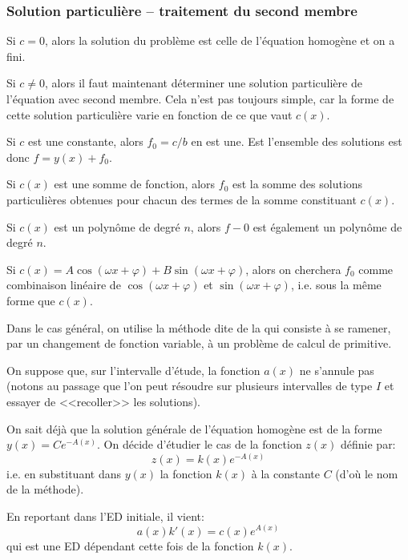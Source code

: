\medskip
\subsubsection{Solution particulière  -- traitement du second membre}

Si $c=0$, alors la solution du problème est celle de l'équation homogène et on a fini.

\medskip
Si $c\ne0$, alors il faut maintenant déterminer une solution particulière de l'équation avec
second membre. Cela n'est pas toujours simple, car la forme de cette solution particulière varie 
en fonction de ce que vaut $c(x)$.

\medskip
Si $c$ est une constante, alors  $f_0=c/b$ en est une. Est l'ensemble des solutions
est donc $f=y(x)+f_0$.

\medskip
Si $c(x)$ est une somme de fonction, alors $f_0$ est la somme des solutions particulières
obtenues pour chacun des termes de la somme constituant $c(x)$.

\medskip
Si $c(x)$ est un polynôme de degré $n$, alors $f-0$ est également un polynôme
de degré $n$.

\medskip
Si $c(x) = A\cos(\omega x + \varphi) + B \sin(\omega x + \varphi)$, alors on cherchera
$f_0$ comme combinaison linéaire de $\cos(\omega x + \varphi)$ et $\sin(\omega x + \varphi)$,
i.e. sous la même forme que $c(x)$.

\medskip
Dans le cas général, on utilise la méthode dite de la 
qui consiste à se ramener, par un changement de fonction variable, à un problème de calcul de 
primitive.

On suppose que, sur l'intervalle d'étude, la fonction $a(x)$ ne s'annule pas (notons au passage que
l'on peut résoudre sur plusieurs intervalles de type $I$ et essayer de <<recoller>> les solutions).

On sait déjà que la solution générale de l'équation homogène est
de la forme $y(x)= Ce^{-A(x)}$.
On décide d'étudier le cas de la fonction $z(x)$ définie par:
\begin{equation}
    z(x) = k(x)e^{- A(x)}
\end{equation}
i.e. en substituant dans $y(x)$ la fonction $k(x)$ à la constante $C$ (d'où le nom de la
méthode).

En reportant dans l'ED initiale, il vient:
\begin{equation}
    a(x)k'(x) = c(x)e^{A(x)}
\end{equation}
qui est une ED dépendant cette fois de la fonction $k(x)$.

